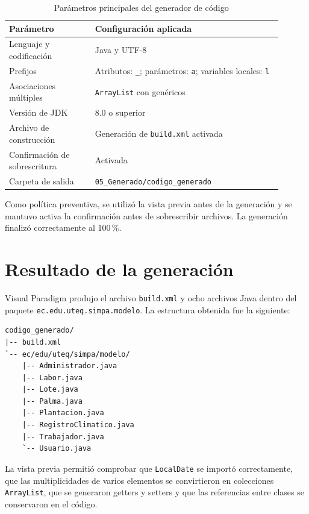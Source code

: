 \documentclass[11pt,a4paper]{article}
\begin{document}
\begin{table}[htbp]
\centering
\small
\caption{Parámetros principales del generador de código}
\begin{tabular}{|p{0.29\linewidth}|p{0.61\linewidth}|}
\hline
\textbf{Parámetro} & \textbf{Configuración aplicada} \\
\hline
Lenguaje y codificación & Java y UTF-8 \\
\hline
Prefijos & Atributos: \texttt{\_}; parámetros: \texttt{a}; variables locales: \texttt{l} \\
\hline
Asociaciones múltiples & \texttt{ArrayList} con genéricos \\
\hline
Versión de JDK & 8.0 o superior \\
\hline
Archivo de construcción & Generación de \texttt{build.xml} activada \\
\hline
Confirmación de sobrescritura & Activada \\
\hline
Carpeta de salida & \texttt{05\_Generado/codigo\_generado} \\
\hline
\end{tabular}
\end{table}

Como política preventiva, se utilizó la vista previa antes de la generación y se mantuvo activa la confirmación antes de sobrescribir archivos. La generación finalizó correctamente al 100\,\%.




\section{Resultado de la generación}

Visual Paradigm produjo el archivo \texttt{build.xml} y ocho archivos Java dentro del paquete \texttt{ec.edu.uteq.simpa.modelo}. La estructura obtenida fue la siguiente:

\begin{verbatim}
codigo_generado/
|-- build.xml
`-- ec/edu/uteq/simpa/modelo/
    |-- Administrador.java
    |-- Labor.java
    |-- Lote.java
    |-- Palma.java
    |-- Plantacion.java
    |-- RegistroClimatico.java
    |-- Trabajador.java
    `-- Usuario.java
\end{verbatim}

La vista previa permitió comprobar que \texttt{LocalDate} se importó correctamente, que las multiplicidades de varios elementos se convirtieron en colecciones \texttt{ArrayList}, que se generaron getters y setters y que las referencias entre clases se conservaron en el código.
\end{document}
